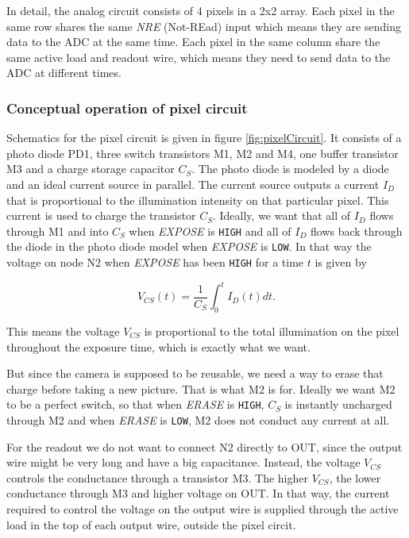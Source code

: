 In detail, the analog circuit consists of 4 pixels in a 2x2 array. Each pixel in the same row shares the same \emph{NRE} (Not-REad) input which means they are sending data to the ADC at the same time. Each pixel in the same column share the same active load and readout wire, which means they need to send data to the ADC at different times.

\subsubsection{Conceptual operation of pixel circuit}

Schematics for the pixel circuit is given in figure \ref{fig:pixelCircuit}. It consists of a photo diode PD1, three switch transistors M1, M2 and M4, one buffer transistor M3 and a charge storage capacitor $C_S$. The photo diode is modeled by a diode and an ideal current source in parallel. The current source outputs a current $I_D$ that is proportional to the illumination intensity on that particular pixel. This current is used to charge the transistor $C_S$. Ideally, we want that all of $I_D$ flows through M1 and into $C_S$ when \emph{EXPOSE} is \verb|HIGH| and all of $I_D$ flows back through the diode in the photo diode model when \emph{EXPOSE} is \verb|LOW|. In that way the voltage on node N2 when \emph{EXPOSE} has been \verb|HIGH| for a time $t$ is given by

\begin{equation}
    V_{CS}(t) = \frac{1}{C_S} \int_0^t I_D(t) dt.
\end{equation}

This means the voltage $V_{CS}$ is proportional to the total illumination on the pixel throughout the exposure time, which is exactly what we want.

But since the camera is supposed to be reusable, we need a way to erase that charge before taking a new picture. That is what M2 is for. Ideally we want M2 to be a perfect switch, so that when \emph{ERASE} is \verb|HIGH|, $C_S$ is instantly uncharged through M2 and when \emph{ERASE} is \verb|LOW|, M2 does not conduct any current at all.

For the readout we do not want to connect N2 directly to OUT, since the output wire might be very long and have a big capacitance. Instead, the voltage $V_{CS}$ controls the conductance through a transistor M3. The higher $V_{CS}$, the lower conductance through M3 and higher voltage on OUT. In that way, the current required to control the voltage on the output wire is supplied through the active load in the top of each output wire, outside the pixel circit.

